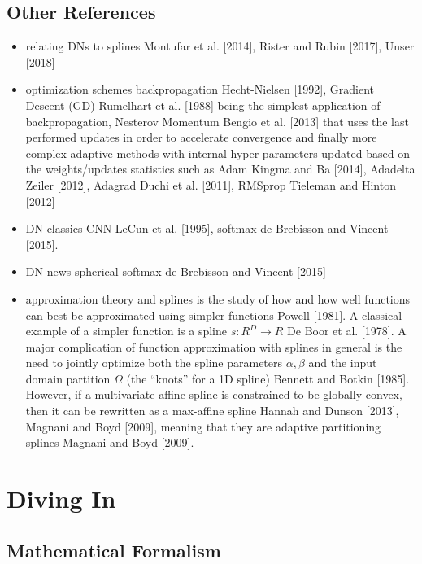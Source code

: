 \documentclass{article}
\begin{document}
\subsection{Other References}

\begin{itemize}
	\item relating DNs to splines
		\subitem Montufar et al. [2014], Rister and Rubin [2017], Unser [2018]
	\item optimization schemes
		\subitem backpropagation Hecht-Nielsen [1992], Gradient Descent (GD) Rumelhart et al. [1988] being the simplest application of backpropagation, Nesterov Momentum Bengio et al. [2013] that uses the last performed updates in order to accelerate convergence and finally more complex adaptive methods with internal hyper-parameters updated based on the weights/updates statistics such as Adam Kingma and Ba [2014], Adadelta Zeiler [2012], Adagrad Duchi et al. [2011], RMSprop Tieleman and Hinton [2012]
	\item DN classics
		\subitem CNN LeCun et al. [1995], softmax de Brebisson and Vincent [2015].
	\item DN news
		\subitem spherical softmax  de Brebisson and Vincent [2015]
	\item approximation theory and splines
		\subitem is the study of how and how well functions can best be approximated using simpler functions Powell [1981]. A classical example of a simpler function is a spline $s : R^D \rightarrow R$ De Boor et al. [1978]. A major complication of function approximation with splines in general is the need to jointly optimize both the spline parameters $\alpha, \beta$ and the input domain partition $\Omega$ (the ``knots'' for a 1D spline) Bennett and Botkin [1985]. However, if a multivariate affine spline is constrained to be globally convex, then it can be rewritten as a max-affine spline Hannah and Dunson [2013], Magnani and Boyd [2009], meaning that they are adaptive partitioning splines Magnani and Boyd [2009].
\end{itemize}


\section{Diving In}


\subsection{Mathematical  Formalism}
\end{document}
